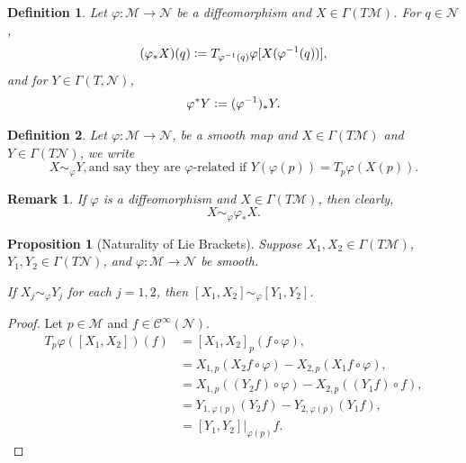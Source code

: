 \documentclass[10pt]{article}
\newtheorem{proposition}{Proposition}[section]
\newtheorem{definition}{Definition}[section]
\newtheorem{remark}{Remark}[section]
\newcommand{\defeq}{\vcentcolon=}
\newcommand{\M}[0]{\mathcal{M}}
\newcommand{\maniN}[0]{\mathcal{N}}
\begin{document}
\begin{definition}
Let $\varphi:\M\to\maniN$ be a diffeomorphism and $X\in\Gamma(T\M)$. For $q\in\maniN$,
\begin{equation*}
  (\varphi_*X)(q) \defeq T_{\varphi^{-1}(q)}\varphi[X(\varphi^{-1}(q))],
\end{equation*}
and for $Y\in\Gamma(T,\maniN)$,
\begin{equation*}
  \varphi^*Y\defeq (\varphi^{-1})_*Y.
\end{equation*}
\end{definition}

\begin{definition}
  Let $\varphi:\M\to\maniN$, be a smooth map and $X\in\Gamma(T\M)$ and $Y\in\Gamma(T\maniN)$, we write
  \begin{equation*}
    X\sim_\varphi Y, \text{and say they are $\varphi$-related if } Y (\varphi(p)) = T_p\varphi(X(p)).
  \end{equation*}
\end{definition}

\begin{remark}
  If $\varphi$ is a diffeomorphism and $X\in\Gamma(T\M)$, then clearly,
  \begin{equation*}
    X\sim_\varphi\varphi_*X.
  \end{equation*}
\end{remark}

\begin{proposition}[Naturality of Lie Brackets]
  Suppose $X_1,X_2\in \Gamma(T\M)$, $Y_1,Y_2\in\Gamma(T\maniN)$, and $\varphi:\M\to\maniN$ be smooth. 
  \par If $X_j\sim_\varphi Y_j$ for each $j=1,2$, then $[X_1,X_2]\sim_\varphi[Y_1,Y_2]$.
\end{proposition}

\begin{proof}
  Let $p\in\M$ and $f\in\mathcal{C}^\infty(\maniN)$. 
  \begin{align*}
    T_p\varphi([X_1,X_2])(f) &= [X_1,X_2]_p(f\circ \varphi),\\
     & = X_{1,p}(X_2f\circ\varphi)-X_{2,p}(X_1f\circ\varphi),\\
     & = X_{1,p}((Y_2f)\circ\varphi)-X_{2,p}((Y_1f)\circ f),\\
     & = Y_{1,\varphi(p)}(Y_2f)-Y_{2,\varphi(p)}(Y_1f),\\
     & = [Y_1,Y_2]|_{\varphi(p)}f.
  \end{align*}
\end{proof}
\end{document}
